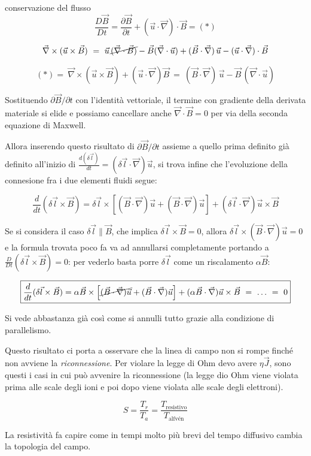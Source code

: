 \begin{teorema}{conservazione del flusso}{}
	\[\frac{D\vec B}{Dt}=\frac{\partial\vec B}{\partial t}+(\vec u\cdot \vec \nabla)\cdot \vec B=(*)\]
	
	\[\vec \nabla\times(\vec u\times\vec B)\ =\ \vec u\,\cancel{( \vec \nabla \cdot \vec B)}-\vec B( \vec \nabla \cdot\vec u) + (\vec B \cdot \vec\nabla)\,\vec u-(\vec u\cdot\vec \nabla)\cdot \vec B\]
	
	\[(*)=\ \vec \nabla\times(\vec u\times\vec B) + (\vec u\cdot \vec \nabla) \vec B\ =\ (\vec B\cdot \vec \nabla)\, \vec u - \vec B\, (\vec \nabla\cdot \vec u)\] 
	
	Sostituendo $\partial\vec B/\partial t$ con l'identità vettoriale, il termine con gradiente della derivata materiale si elide e possiamo cancellare anche  $\vec \nabla\cdot \vec B=0$ per via della seconda equazione di Maxwell.
	
	Allora inserendo questo risultato di $\partial\vec B/\partial t$ assieme a quello prima definito già definito all'inizio di $\frac{d(\delta\vec l)}{dt}=(\delta \vec l\cdot\vec \nabla)\vec u$, si trova infine che l'evoluzione della connesione fra i due elementi fluidi segue: 
	
	\[\frac{d}{dt}(\delta\vec l\times\vec B)=\delta\vec l\times \left[(\vec B\cdot\vec \nabla )\vec u+(\vec B\cdot\vec \nabla )\vec u\right]  +(\delta\vec l\cdot\vec\nabla)\vec u\times\vec B\] 
	
	\vspace{0.5cm}
	
	Se si considera il caso $\delta \vec l\parallel\vec B$, che implica $\delta \vec l\times \vec B = 0$, allora  $\delta\vec l\times(\vec B\cdot\vec \nabla) \vec u=0$ e la formula trovata poco fa va ad annullarsi completamente portando a $\frac{D}{Dt}(\delta \vec l \times \vec B)=0$: per vederlo basta porre $\delta\vec l$ come un riscalamento $\alpha \vec B$:
	
	
	\[\boxed{\frac{d}{dt}(\delta\vec l\times\vec B)=\alpha\vec B\times \left[\cancel{(\vec B\cdot\vec \nabla )\vec u}+(\vec B\cdot\vec \nabla )\vec u\right]  +(\alpha \vec B \cdot\vec\nabla)\vec u\times\vec B \ =\ \dots\ =\ 0}\] 
	
	Si vede abbastanza già così come si annulli tutto grazie alla condizione di parallelismo.
	
	Questo risultato ci porta a osservare che la linea di campo non si rompe finché non avviene la \textit{riconnessione}. Per  violare la legge di Ohm devo avere $\eta\vec J$, sono questi i casi in cui può avvenire la riconnessione (la legge dio Ohm viene violata prima alle scale degli ioni e poi dopo viene violata alle scale degli elettroni).
	
	\[S=\frac{T_r}{T_a}=\frac{T_\text{resistivo}}{T_\text{alfvén}}\] 
	
	La resistività fa capire come in tempi molto più brevi del tempo diffusivo cambia la topologia del campo. 
	
\end{teorema}

